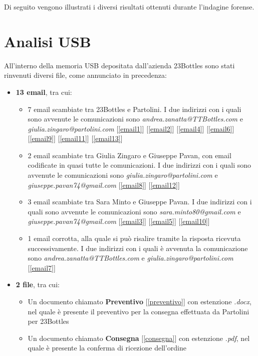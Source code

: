 Di seguito vengono illustrati i diversi risultati ottenuti durante l'indagine forense.
\section{Analisi USB}
All'interno della memoria USB depositata dall'azienda 23Bottles sono stati rinvenuti diversi file, come annunciato in precedenza:
\begin{itemize}
    \item \textbf{13 email}, tra cui:
        \begin{itemize}
            \item 7 email scambiate tra 23Bottles e Partolini. I due indirizzi con i quali sono avvenute le comunicazioni sono \textit{andrea.zanatta@TTBottles.com} e \\ \textit{giulia.zingaro@partolini.com} [\ref{email1}] [\ref{email2}] [\ref{email4}] [\ref{email6}] [\ref{email9}] [\ref{email11}] [\ref{email13}]
            \item 2 email scambiate tra Giulia Zingaro e Giuseppe Pavan, con email codificate in quasi tutte le comunicazioni. I due indirizzi con i quali sono avvenute le comunicazioni sono \textit{giulia.zingaro@partolini.com} e \textit{giuseppe.pavan74@gmail.com} [\ref{email8}] [\ref{email12}]
            \item 3 email scambiate tra Sara Minto e Giuseppe Pavan. I due indirizzi con i quali sono avvenute le comunicazioni sono \textit{sara.minto80@gmail.com} e \\ \textit{giuseppe.pavan74@gmail.com} [\ref{email3}] [\ref{email5}] [\ref{email10}]
            \item 1 email corrotta, alla quale si può risalire tramite la risposta ricevuta successivamente. I due indirizzi con i quali è avvenuta la comunicazione sono \textit{andrea.zanatta@TTBottles.com} e \textit{giulia.zingaro@partolini.com} [\ref{email7}]
        \end{itemize} 
    \item \textbf{2 file}, tra cui:
        \begin{itemize}
            \item Un documento chiamato \textbf{Preventivo} [\ref{preventivo}] con estenzione \textit{.docx}, nel quale è presente il preventivo per la consegna effettuata da Partolini per 23Bottles
            \item Un documento chiamato \textbf{Consegna} [\ref{consegna}] con estenzione \textit{.pdf}, nel quale è presente la conferma di ricezione dell'ordine
        \end{itemize}
\end{itemize}
